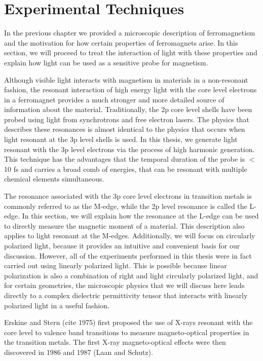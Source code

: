 \chapter{Experimental Techniques}

In the previous chapter we provided a microscopic description of ferromagnetism and the motivation for how certain properties of ferromagnets arise. In this section, we will proceed to treat the interaction of light with these properties and explain how light can be used as a sensitive probe for magnetism. 

Although visible light interacts with magnetism in materials in a non-resonant fashion, the resonant interaction of high energy light with the core level electrons in a ferromagnet provides a much stronger and more detailed source of information about the material. Traditionally, the 2p core level shells have been probed using light from synchrotrons and free electron lasers. The physics that describes these resonances is almost identical to the physics that occurs when light resonant at the 3p level shells is used. In this thesis, we generate light resonant with the 3p level electrons via the process of high harmonic generation. This technique has the advantages that the temporal duration of the probe is $<$ 10 fs and carries a broad comb of energies, that can be resonant with multiple chemical elements simultaneous. 

The resonance associated with the 3p core level electrons in transition metals is commonly referred to as the M-edge, while the 2p level resonance is called the L-edge. In this section, we will explain how the resonance at the L-edge can be used to directly measure the magnetic moment of a material. This description also applies to light resonant at the M-edges. Additionally, we will focus on circularly polarized light, because it provides an intuitive and convenient basis for our discussion. However, all of the experiments performed in this thesis were in fact carried out using linearly polarized light. This is possible because linear polarization is also a combination of right and light circularly polarized light, and for certain geometries, the microscopic physics that we will discuss here leads directly to a complex dielectric permittivity tensor that interacts with linearly polarized light in a useful fashion.

Erskine and Stern (cite 1975) first proposed the use of X-rays resonant with the core level to valence band transitions to measure magneto-optical properties in the transition metals. The first X-ray magneto-optical effects were then discovered in 1986 and 1987 (Laan and Schutz).

